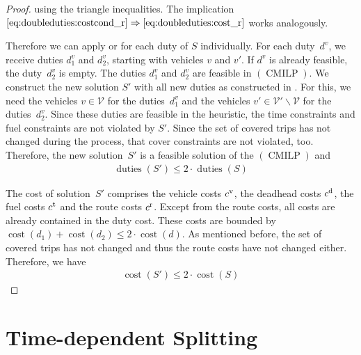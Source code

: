 \begin{proof}
using the triangle inequalities. The implication ${\eqref{eq:doubleduties:costcond_r}\Rightarrow\eqref{eq:doubleduties:cost_r}}$ works analogously.

Therefore we can apply  or  for each duty of $S$ individually. For each duty~$d^v$, we receive duties $d^v_1$ and $d^v_2$, starting with vehicles $v$ and $v'$. If $d^v$ is already feasible, the duty~$d^v_2$ is empty. The duties $d^v_1$ and $d^v_2$ are feasible in $(\operatorname{CMILP})$. We construct the new solution $S'$ with all new duties as constructed in . For this, we need the vehicles $v\in\mathcal{V}$ for the duties~$d^v_1$ and the vehicles ${v'\in\mathcal{V}'\backslash\mathcal{V}}$ for the duties~$d^v_2$. Since these duties are feasible in the heuristic, the time constraints and fuel constraints are not violated by $S'$. Since the set of covered trips has not changed during the process, that cover constraints are not violated, too. Therefore, the new solution~$S'$ is a feasible solution of the $(\operatorname{CMILP})$ and
\begin{align*}
	\operatorname{duties}\left(S'\right) \leq 2\cdot\operatorname{duties}\left(S\right)
\end{align*}

The cost of solution~$S'$ comprises the vehicle costs $c^{\operatorname{v}}$, the deadhead costs $c^{\operatorname{d}}$, the fuel costs $c^{\operatorname{t}}$ and the route costs $c^{\operatorname{r}}$. Except from the route costs, all costs are already contained in the duty cost. These costs are bounded by ${\operatorname{cost}\left(d_1\right) + \operatorname{cost}\left(d_2\right) \leq 2\cdot\operatorname{cost}\left(d\right)}$. As mentioned before, the set of covered trips has not changed and thus the route costs have not changed either. Therefore, we have
\begin{align*}
	\operatorname{cost}\left(S'\right) \leq 2\cdot\operatorname{cost}\left(S\right)
\end{align*}

\end{proof}


\section{Time-dependent Splitting}
\label{sec:time_dependent_splitting}

